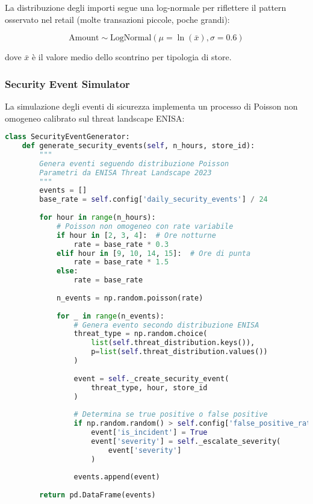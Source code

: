 La distribuzione degli importi segue una log-normale per riflettere il pattern osservato nel retail (molte transazioni piccole, poche grandi):

\begin{equation}
\text{Amount} \sim \text{LogNormal}(\mu = \ln(\bar{x}), \sigma = 0.6)
\end{equation}

dove $\bar{x}$ è il valore medio dello scontrino per tipologia di store.

\subsubsection{\texorpdfstring{Security Event Simulator}{B.1.3.2 - Security Event Simulator}}

La simulazione degli eventi di sicurezza implementa un processo di Poisson non omogeneo calibrato sul threat landscape ENISA:

\begin{lstlisting}[language=Python, caption={Simulazione eventi sicurezza con distribuzione ENISA}, label={lst:security-gen}]
class SecurityEventGenerator:
    def generate_security_events(self, n_hours, store_id):
        """
        Genera eventi seguendo distribuzione Poisson
        Parametri da ENISA Threat Landscape 2023
        """
        events = []
        base_rate = self.config['daily_security_events'] / 24
        
        for hour in range(n_hours):
            # Poisson non omogeneo con rate variabile
            if hour in [2, 3, 4]:  # Ore notturne
                rate = base_rate * 0.3
            elif hour in [9, 10, 14, 15]:  # Ore di punta
                rate = base_rate * 1.5
            else:
                rate = base_rate
            
            n_events = np.random.poisson(rate)
            
            for _ in range(n_events):
                # Genera evento secondo distribuzione ENISA
                threat_type = np.random.choice(
                    list(self.threat_distribution.keys()),
                    p=list(self.threat_distribution.values())
                )
                
                event = self._create_security_event(
                    threat_type, hour, store_id
                )
                
                # Determina se true positive o false positive
                if np.random.random() > self.config['false_positive_rate']:
                    event['is_incident'] = True
                    event['severity'] = self._escalate_severity(
                        event['severity']
                    )
                    
                events.append(event)
                
        return pd.DataFrame(events)
\end{lstlisting}

